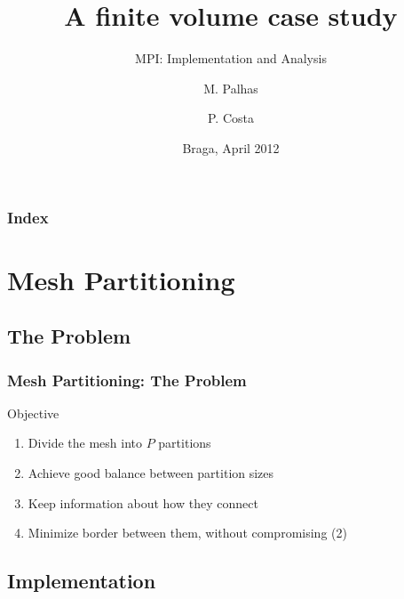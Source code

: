 \documentclass{beamer}
\title{A finite volume case study}
\subtitle{MPI: Implementation and Analysis}
\author{M. Palhas \and P. Costa}
\institute[19808 \and 19830]{
	University of Minho\\
	Department of Informatics
}
\date{Braga, April 2012}
\begin{document}

\begin{frame}[plain]
	\titlepage
\end{frame}

\begin{frame}
	\frametitle{Index}
	\tableofcontents
\end{frame}



%
%
%
%

\section{Mesh Partitioning}

\subsection{The Problem}

\begin{frame}
	\frametitle{Mesh Partitioning: The Problem}

	\begin{block}{Objective}
		\begin{enumerate}\itemsep=10pt
			\item Divide the mesh into $P$ partitions
			\pause
			\item Achieve good balance between partition sizes
			\pause
			\item Keep information about how they connect
			\pause
			\item Minimize border between them, without compromising (2)
		\end{enumerate}
	\end{block}


\end{frame}




%
%
%
%

\subsection{Implementation}
\end{document}
